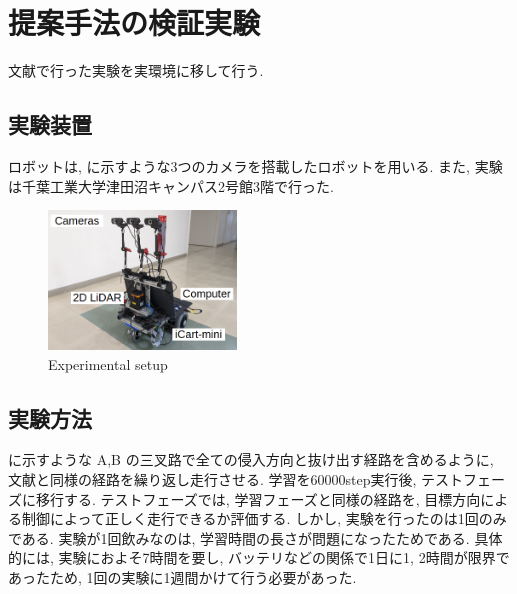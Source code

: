 \documentclass{jarticle}
\begin{document}

\section{提案手法の検証実験}
文献\cite{mech}で行った実験を実環境に移して行う.
\subsection{実験装置}
ロボットは, に示すような3つのカメラを搭載したロボットを用いる. また, 実験は千葉工業大学津田沼キャンパス2号館3階で行った.

\begin{figure}[h]
  \centering
   \includegraphics[width=50mm]{gamma3.png}
   \vspace*{-4mm}
   \caption{Experimental setup}
   \label{fig: fig6}
 \end{figure}

 \subsection{実験方法}
 に示すような A,B の三叉路で全ての侵入方向と抜け出す経路を含めるように, 文献\cite{mech}と同様の経路を繰り返し走行させる. 学習を60000step実行後, テストフェーズに移行する. テストフェーズでは, 学習フェーズと同様の経路を, 目標方向による制御によって正しく走行できるか評価する. しかし, 実験を行ったのは1回のみである. 実験が1回飲みなのは, 学習時間の長さが問題になったためである. 具体的には, 実験におよそ7時間を要し, バッテリなどの関係で1日に1, 2時間が限界であったため, 1回の実験に1週間かけて行う必要があった.
\end{document}

